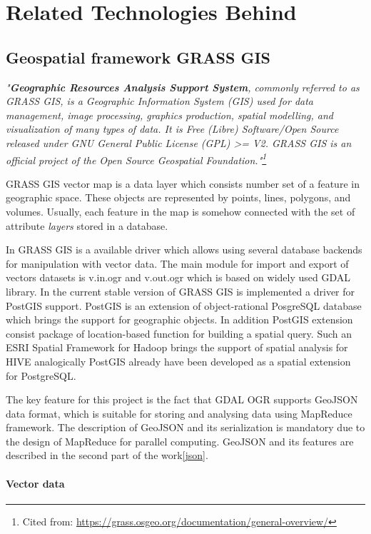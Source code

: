 \documentclass[a4paper,12pt,oneside]{report}
\begin{document}
	
    
\section{Related Technologies Behind}
    \subsection{Geospatial framework GRASS GIS}

\textit{"\textbf{Geographic Resources Analysis Support System}, 
commonly referred to as GRASS GIS, is a Geographic Information System (GIS) used for
 data management, image processing, graphics production, 
spatial modelling, and visualization of many types of data. It is Free (Libre) Software/Open
 Source released under GNU General Public License 
(GPL) >= V2. GRASS GIS is an official project of the Open Source Geospatial Foundation."\footnote{Cited from:
 \url{https://grass.osgeo.org/documentation/general-overview/}}}

 
GRASS GIS vector map is a data layer which consists number set of a feature in geographic space. 
These objects are represented by points, lines, polygons, and volumes. Usually, each feature in the 
map is somehow connected with the set of attribute \textit{layers} stored in a database. 

In GRASS GIS is a available driver which allows using several database backends for manipulation 
with vector data. The main module for import and export of vectors datasets is v.in.ogr and v.out.ogr 
which is based on widely used GDAL library. 
In the current stable version of GRASS GIS is implemented a driver for PostGIS support. PostGIS is 
an extension of object-rational PosgreSQL database which brings the support for geographic objects. 
In addition PostGIS extension consist package of 
location-based function for building a spatial query. Such an ESRI Spatial Framework for Hadoop 
brings the support of spatial analysis for HIVE analogically PostGIS 
already have been developed as a spatial extension for PostgreSQL.  

The key feature for this project is the fact that GDAL OGR supports GeoJSON data format, which is suitable 
for storing and analysing data using MapReduce framework. The description of GeoJSON and its serialization is 
mandatory due to the design of MapReduce 
for parallel computing. GeoJSON and its features are described in the second part of the work\ref{json}.

\paragraph{Vector data}
\end{document}
